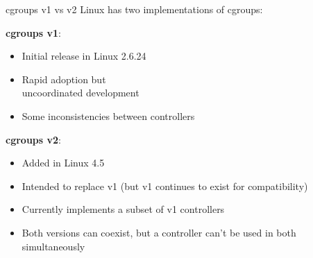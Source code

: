 \begin{concept}{cgroups v1 vs v2}
    Linux has two implementations of cgroups:

    \begin{minipage}{0.3\linewidth}
        \textbf{cgroups v1}:
            \begin{itemize}
                \item Initial release in Linux 2.6.24
                \item Rapid adoption but \\ uncoordinated development
                \item Some inconsistencies between controllers
            \end{itemize}
        \end{minipage}
        \hspace{2mm}
        \begin{minipage}{0.65\linewidth}
        \textbf{cgroups v2}:
            \begin{itemize}
                \item Added in Linux 4.5
                \item Intended to replace v1 (but v1 continues to exist for compatibility)
                \item Currently implements a subset of v1 controllers
                \item Both versions can coexist, but a controller can't be used in both simultaneously
            \end{itemize}
    \end{minipage}
\end{concept}


